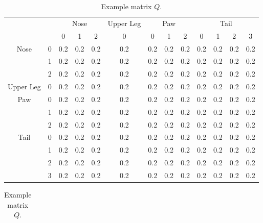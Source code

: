 \begin{table}
    \RawFloats
    \parbox{.48\linewidth}{
        \strut
        \centering
        \begin{tabular}{@{}ccccccccccccc@{}}
            &   & \multicolumn{3}{c}{Nose} & Upper Leg & \multicolumn{3}{c}{Paw} & \multicolumn{4}{c}{Tail} \\
            &   & 0      & 1      & 2      & 0         & 0      & 1      & 2     & 0    & 1    & 2    & 3   \\
\multirow{3}{*}{Nose} & 0 & 0.2    & 0.2    & 0.2    & 0.2       & 0.2    & 0.2    & 0.2   & 0.2  & 0.2  & 0.2  & 0.2 \\
            & 1 & 0.2    & 0.2    & 0.2    & 0.2       & 0.2    & 0.2    & 0.2   & 0.2  & 0.2  & 0.2  & 0.2 \\
            & 2 & 0.2    & 0.2    & 0.2    & 0.2       & 0.2    & 0.2    & 0.2   & 0.2  & 0.2  & 0.2  & 0.2 \\
Upper Leg             & 0 & 0.2    & 0.2    & 0.2    & 0.2       & 0.2    & 0.2    & 0.2   & 0.2  & 0.2  & 0.2  & 0.2 \\
\multirow{3}{*}{Paw}  & 0 & 0.2    & 0.2    & 0.2    & 0.2       & 0.2    & 0.2    & 0.2   & 0.2  & 0.2  & 0.2  & 0.2 \\
            & 1 & 0.2    & 0.2    & 0.2    & 0.2       & 0.2    & 0.2    & 0.2   & 0.2  & 0.2  & 0.2  & 0.2 \\
            & 2 & 0.2    & 0.2    & 0.2    & 0.2       & 0.2    & 0.2    & 0.2   & 0.2  & 0.2  & 0.2  & 0.2 \\
\multirow{4}{*}{Tail} & 0 & 0.2    & 0.2    & 0.2    & 0.2       & 0.2    & 0.2    & 0.2   & 0.2  & 0.2  & 0.2  & 0.2 \\
            & 1 & 0.2    & 0.2    & 0.2    & 0.2       & 0.2    & 0.2    & 0.2   & 0.2  & 0.2  & 0.2  & 0.2 \\
            & 2 & 0.2    & 0.2    & 0.2    & 0.2       & 0.2    & 0.2    & 0.2   & 0.2  & 0.2  & 0.2  & 0.2 \\
            & 3 & 0.2    & 0.2    & 0.2    & 0.2       & 0.2    & 0.2    & 0.2   & 0.2  & 0.2  & 0.2  & 0.2
\end{tabular}
        \caption{Example matrix $Q$.}
        \label{tab:oja-example-inputs}
    }
    \hfill
    \parbox{.48\linewidth}{
        \strut
        \centering
        \parbox{\linewidth}{
            \strut
            \centering
            \begin{tabular}{@{}lllll@{}}

\end{tabular}}}
\end{table}
